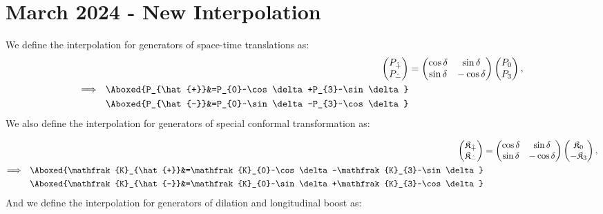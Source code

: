 \documentclass[]{article}
\numberwithin{equation}{section}
\begin{document}
{{\section{March 2024 - New Interpolation}
We define the interpolation for generators of space-time translations as:
\begin{align}
\begin{pmatrix}
    P_{\hat{+}}\\
    P_{\hat{-}}
  \end{pmatrix}&=
  \begin{pmatrix}
    \cos\delta   & \sin\delta \\
    \sin\delta   & -\cos\delta
  \end{pmatrix}
  \begin{pmatrix}
    P_{0}\\
    P_{3}
  \end{pmatrix},\\
\Longrightarrow~~\Aboxed{P_{\hat{+}}&=P_{0}~\cos\delta+P_{3}~\sin\delta}\\
\Aboxed{P_{\hat{-}}&=P_{0}~\sin\delta-P_{3}~\cos\delta}
\end{align}
We also define the interpolation for generators of special conformal transformation as:

\begin{align}
\begin{pmatrix}
    \mathfrak{K}_{\hat{+}}\\
    \mathfrak{K}_{\hat{-}}
  \end{pmatrix}&=
  \begin{pmatrix}
    \cos\delta   & \sin\delta \\
    \sin\delta   & -\cos\delta
  \end{pmatrix}
  \begin{pmatrix}
    \mathfrak{K}_{0}\\
    -\mathfrak{K}_{3}
  \end{pmatrix},\\
\Longrightarrow~~\Aboxed{\mathfrak{K}_{\hat{+}}&=\mathfrak{K}_{0}~\cos\delta-\mathfrak{K}_{3}~\sin\delta}\\
\Aboxed{\mathfrak{K}_{\hat{-}}&=\mathfrak{K}_{0}~\sin\delta+\mathfrak{K}_{3}~\cos\delta}
\end{align}
And we define the interpolation for generators of dilation and longitudinal boost as:

}}
\end{document}
